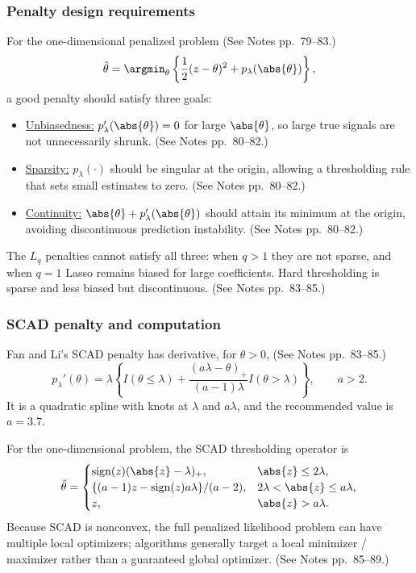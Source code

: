 \subsubsection{Penalty design requirements}
For the one-dimensional penalized problem (See Notes pp.~79--83.)
\[
\hat\theta=\argmin_\theta
\left\{\frac12(z-\theta)^2+p_\lambda(\abs{\theta})\right\},
\]
a good penalty should satisfy three goals:
\begin{itemize}
    \item \underline{Unbiasedness:} $p_\lambda'(\abs{\theta})=0$ for large $\abs{\theta}$, so large true signals are not unnecessarily shrunk. (See Notes pp.~80--82.)
    \item \underline{Sparsity:} $p_\lambda(\cdot)$ should be singular at the origin, allowing a thresholding rule that sets small estimates to zero. (See Notes pp.~80--82.)
    \item \underline{Continuity:} $\abs{\theta}+p_\lambda'(\abs{\theta})$ should attain its minimum at the origin, avoiding discontinuous prediction instability. (See Notes pp.~80--82.)
\end{itemize}
The $L_q$ penalties cannot satisfy all three: when $q>1$ they are not sparse, and when $q=1$ Lasso remains biased for large coefficients. Hard thresholding is sparse and less biased but discontinuous. (See Notes pp.~83--85.)

\subsubsection{SCAD penalty and computation}
Fan and Li's SCAD penalty has derivative, for $\theta>0$, (See Notes pp.~83--85.)
\[
p_\lambda'(\theta)
=
\lambda\left\{
I(\theta\le\lambda)
+
\frac{(a\lambda-\theta)_+}{(a-1)\lambda}I(\theta>\lambda)
\right\},
\qquad a>2.
\]
It is a quadratic spline with knots at $\lambda$ and $a\lambda$, and the recommended value is $a=3.7$.

For the one-dimensional problem, the SCAD thresholding operator is
\[
\hat\theta=
\begin{cases}
\operatorname{sign}(z)(\abs{z}-\lambda)_+, & \abs{z}\le 2\lambda,\\
\{(a-1)z-\operatorname{sign}(z)a\lambda\}/(a-2), & 2\lambda<\abs{z}\le a\lambda,\\
z, & \abs{z}>a\lambda.
\end{cases}
\]
Because SCAD is nonconvex, the full penalized likelihood problem can have multiple local optimizers; algorithms generally target a local minimizer / maximizer rather than a guaranteed global optimizer. (See Notes pp.~85--89.)

